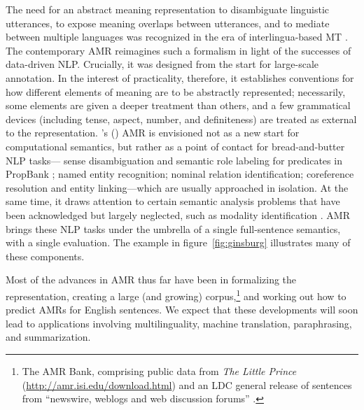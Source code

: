 \documentclass[11pt,letterpaper]{article}
\newcommand{\fref}[1]{figure~\ref{#1}}
\newcommand{\Citeposs}[2][]{\Citeauthor{#2}'s (\citeyear[#1]{#2})}
\begin{document}
The need for an abstract meaning representation to disambiguate linguistic utterances, 
to expose meaning overlaps between utterances, and to mediate between multiple languages 
was recognized in the era of interlingua-based MT \citep{dorr-98}. 
The contemporary AMR reimagines such a formalism in light of the successes of data-driven NLP.
Crucially, it was designed from the start for large-scale annotation. 
In the interest of practicality, therefore, it establishes conventions for how different elements 
of meaning are to be abstractly represented; necessarily, some elements are given a deeper treatment 
than others, and a few grammatical devices (including tense, aspect, number, and definiteness) 
are treated as external to the representation.
\Citeposs{amr} AMR is envisioned not as a new start for computational semantics, 
but rather as a point of contact for bread-and-butter NLP tasks---%
sense disambiguation and semantic role labeling for predicates in PropBank \citep{propbank,bonial-14}; 
named entity recognition; nominal relation identification; 
coreference resolution and entity linking---which are usually approached in isolation. 
At the same time, it draws attention to certain semantic analysis problems that have been 
acknowledged but largely neglected, such as modality identification \citep{prabhakaran-12}.
AMR brings these NLP tasks under the umbrella of a single full-sentence semantics, 
with a single evaluation. The example in \fref{fig:ginsburg} illustrates many of these components.

Most of the advances in AMR thus far have been in formalizing the representation, 
creating a large (and growing) corpus,\footnote{The AMR Bank, comprising 
public data from \textit{The Little Prince} (\url{http://amr.isi.edu/download.html}) 
and an LDC general release of sentences from ``newswire, weblogs and web discussion forums'' \citep{amr-ldc}.} 
and working out how to predict AMRs for English sentences. 
We expect that these developments will soon lead to applications 
involving multilinguality, machine translation, paraphrasing, and summarization.
\end{document}
